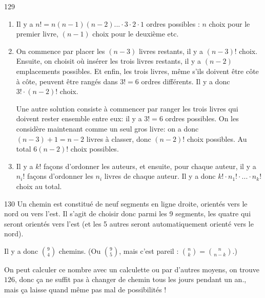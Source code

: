 \begin{Soln}{129}
\begin{enumerate}
\item Il y a $n!=n(n-1)(n-2)...\cdot 3\cdot 2\cdot 1$ ordres possibles : $n$ choix pour le premier livre, $(n-1)$ choix pour le deuxième etc.
\item On commence par placer les $(n-3)$ livres restants, il y a $(n-3)!$ choix. Ensuite, on choisit où insérer les trois livres restants, il y a $(n-2)$ emplacements possibles. Et enfin, les trois livres, même s'ils doivent être côte à côte, peuvent être rangés dans $3!=6$ ordres différents. Il y a donc $3!\cdot (n-2)!$ choix.

Une autre solution consiste à commencer par ranger les trois livres qui doivent rester ensemble entre eux: il y a $3!=6$ ordres possibles. On les considère maintenant comme un seul gros livre: on a donc $(n-3)+1=n-2$ livres à classer, donc $(n-2)!$ choix possibles. Au total $6(n-2)!$ choix possibles.

\item Il y a $k!$ façons d'ordonner les auteurs, et ensuite, pour chaque auteur, il y a $n_i!$ façons d'ordonner les $n_i$ livres de chaque auteur. Il y a donc $k! \cdot n_1!\cdot ... \cdot n_k!$ choix au total.
\end{enumerate}
\end{Soln}
\begin{Soln}{130}
Un chemin est constitué de neuf segments en ligne droite, orientés vers le nord ou vers l'est. Il s'agit de choisir donc parmi les 9 segments, les quatre qui seront orientés vers l'est (et les 5 autres seront automatiquement orienté vers le nord).

Il y a donc $\binom{9}{4}$ chemins. (Ou $\binom{9}{5}$, mais c'est pareil : $\binom{n}{k} = \binom{n}{n-k}$.)

On peut calculer ce nombre avec un calculette ou par d'autres moyens, on trouve $126$, donc ça ne suffit pas à changer de chemin tous les jours pendant un an., mais ça laisse quand même pas mal de possibilités !

\end{Soln}
